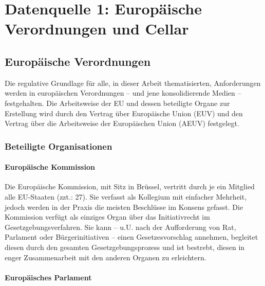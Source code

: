 \chapter{Datenquelle 1: Europäische Verordnungen und Cellar}




    \section{Europäische Verordnungen}


    Die regulative Grundlage für alle, in dieser Arbeit thematisierten, Anforderungen werden in europäischen Verordnungen -- und jene konsolidierende Medien -- festgehalten.
    Die Arbeitsweise der EU und dessen beteiligte Organe zur Erstellung  wird durch den Vertrag über Europäische Union (EUV) und den Vertrag über die Arbeitsweise der Europäischen Union (AEUV) festgelegt.
    
        
        
        \subsection{Beteiligte Organisationen}


\subsubsection{Europäische Kommission}

Die Europäische Kommission, mit Sitz in Brüssel, vertritt durch je ein Mitglied alle EU-Staaten (zzt.: 27). Sie verfasst als Kollegium mit einfacher Mehrheit, jedoch werden in der Praxis die meisten Beschlüsse im Konsens gefasst. 
Die Kommission verfügt als einziges Organ über das Initiativrecht im Gesetzgebungsverfahren. 
Sie kann – u.U. nach der Aufforderung von Rat, Parlament oder Bürgerinitiativen – einen Gesetzesvorschlag annehmen, begleitet diesen durch den gesamten Gesetzgebungsprozess und ist bestrebt, diesen in enger Zusammenarbeit mit den anderen Organen zu erleichtern.
\cite[Art. 17]{EUV}

\subsubsection{Europäisches Parlament}

